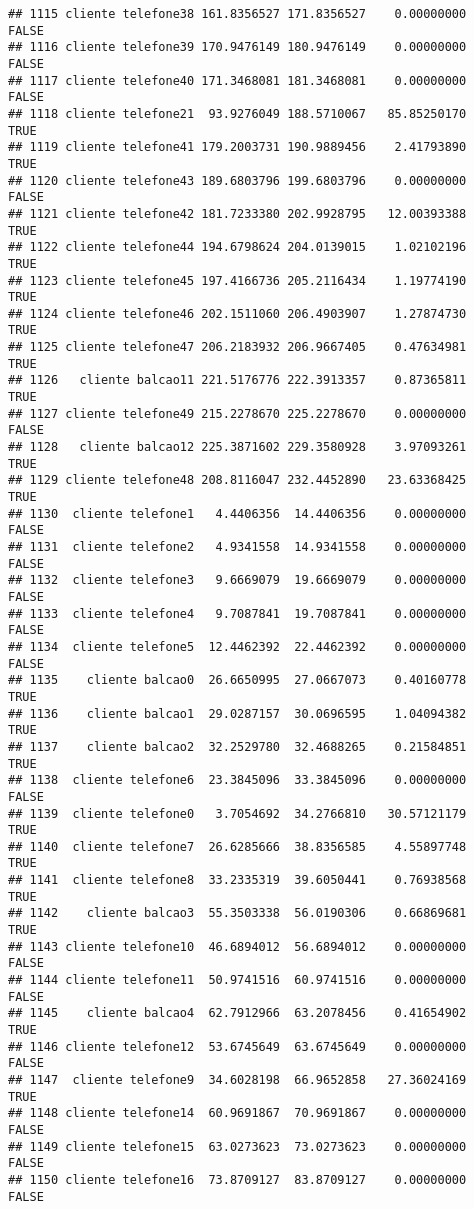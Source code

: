 \documentclass[
]{article}
\begin{document}
\begin{verbatim}
## 1115 cliente telefone38 161.8356527 171.8356527    0.00000000    FALSE
## 1116 cliente telefone39 170.9476149 180.9476149    0.00000000    FALSE
## 1117 cliente telefone40 171.3468081 181.3468081    0.00000000    FALSE
## 1118 cliente telefone21  93.9276049 188.5710067   85.85250170     TRUE
## 1119 cliente telefone41 179.2003731 190.9889456    2.41793890     TRUE
## 1120 cliente telefone43 189.6803796 199.6803796    0.00000000    FALSE
## 1121 cliente telefone42 181.7233380 202.9928795   12.00393388     TRUE
## 1122 cliente telefone44 194.6798624 204.0139015    1.02102196     TRUE
## 1123 cliente telefone45 197.4166736 205.2116434    1.19774190     TRUE
## 1124 cliente telefone46 202.1511060 206.4903907    1.27874730     TRUE
## 1125 cliente telefone47 206.2183932 206.9667405    0.47634981     TRUE
## 1126   cliente balcao11 221.5176776 222.3913357    0.87365811     TRUE
## 1127 cliente telefone49 215.2278670 225.2278670    0.00000000    FALSE
## 1128   cliente balcao12 225.3871602 229.3580928    3.97093261     TRUE
## 1129 cliente telefone48 208.8116047 232.4452890   23.63368425     TRUE
## 1130  cliente telefone1   4.4406356  14.4406356    0.00000000    FALSE
## 1131  cliente telefone2   4.9341558  14.9341558    0.00000000    FALSE
## 1132  cliente telefone3   9.6669079  19.6669079    0.00000000    FALSE
## 1133  cliente telefone4   9.7087841  19.7087841    0.00000000    FALSE
## 1134  cliente telefone5  12.4462392  22.4462392    0.00000000    FALSE
## 1135    cliente balcao0  26.6650995  27.0667073    0.40160778     TRUE
## 1136    cliente balcao1  29.0287157  30.0696595    1.04094382     TRUE
## 1137    cliente balcao2  32.2529780  32.4688265    0.21584851     TRUE
## 1138  cliente telefone6  23.3845096  33.3845096    0.00000000    FALSE
## 1139  cliente telefone0   3.7054692  34.2766810   30.57121179     TRUE
## 1140  cliente telefone7  26.6285666  38.8356585    4.55897748     TRUE
## 1141  cliente telefone8  33.2335319  39.6050441    0.76938568     TRUE
## 1142    cliente balcao3  55.3503338  56.0190306    0.66869681     TRUE
## 1143 cliente telefone10  46.6894012  56.6894012    0.00000000    FALSE
## 1144 cliente telefone11  50.9741516  60.9741516    0.00000000    FALSE
## 1145    cliente balcao4  62.7912966  63.2078456    0.41654902     TRUE
## 1146 cliente telefone12  53.6745649  63.6745649    0.00000000    FALSE
## 1147  cliente telefone9  34.6028198  66.9652858   27.36024169     TRUE
## 1148 cliente telefone14  60.9691867  70.9691867    0.00000000    FALSE
## 1149 cliente telefone15  63.0273623  73.0273623    0.00000000    FALSE
## 1150 cliente telefone16  73.8709127  83.8709127    0.00000000    FALSE

\end{verbatim}
\end{document}
